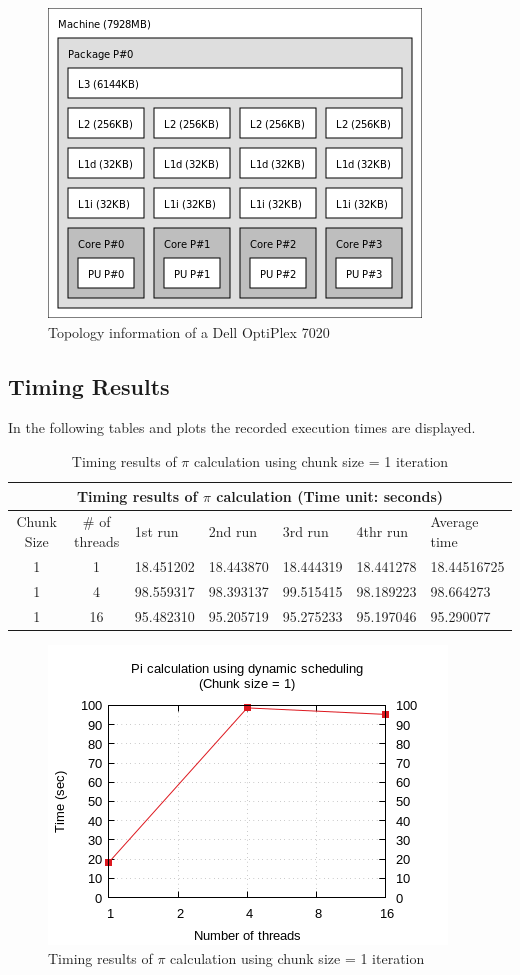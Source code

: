 \documentclass{article}
\begin{document}
\begin{figure}[htbp]
  \centering
  \includegraphics[width=0.5\columnwidth]{./opti7020-topo.png}
  \caption{Topology information of a Dell OptiPlex 7020}
\end{figure}

\pagebreak

\subsection{Timing Results}

In the following tables and plots the recorded execution times are displayed.


\begin{table}[htbp]
  \centering
    \begin{tabular}{|c c||l l l l| l|} 
    \hline
    \multicolumn{7}{|c|}{Timing results of $\pi$ calculation (Time unit: seconds)} \\
    \hline
    Chunk Size & \# of threads & 1st run & 2nd run & 3rd run & 4thr run & Average time\\ [0.5ex] 
    \hline\hline
    1 & 1 & 18.451202 & 18.443870 & 18.444319 & 18.441278 & 18.44516725 \\ 
    \hline
    1 & 4 & 98.559317 & 98.393137 & 99.515415 & 98.189223 & 98.664273 \\
    \hline
    1 & 16 & 95.482310 & 95.205719 & 95.275233 & 95.197046 & 95.290077 \\ [1ex]
    \hline
    \end{tabular}
  \caption{Timing results of $\pi$ calculation using chunk size = 1 iteration}
\end{table}


\begin{figure}[htbp]
  \centering
  \includegraphics[width=0.55\columnwidth]{../ex1/plots/pi_c1.png}
  \caption{Timing results of $\pi$ calculation using chunk size = 1 iteration}
\end{figure}
\end{document}
